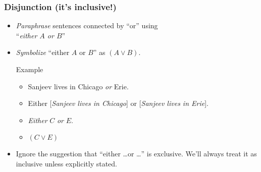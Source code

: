 \begin{frame}
  \frametitle{Disjunction (it's inclusive!)}

  \begin{itemize}[<+->]
  \item \emph{Paraphrase} sentences connected by ``or'' using\\
  ``\emph{either $A$ or $B$}''

  \item \emph{Symbolize} ``either $A$ or $B$'' as
  \emph{$(A \lor B)$}.

  \begin{block}{Example}
  \begin{itemize}[<+->]
  \item[] Sanjeev lives in Chicago \emph{or} Erie.

  \item[] Either [\emph{Sanjeev lives in Chicago}] or [\emph{Sanjeev lives in Erie}].

  \item[] \emph{Either} $C$ \emph{or} $E$.

  \item[] $(C \lor E)$
  \end{itemize}
  \end{block}
  
  \item[] Ignore the suggestion that ``either \dots or \dots'' is exclusive.
  We'll always treat it as inclusive unless explicitly stated.
\end{itemize}

\end{frame}

